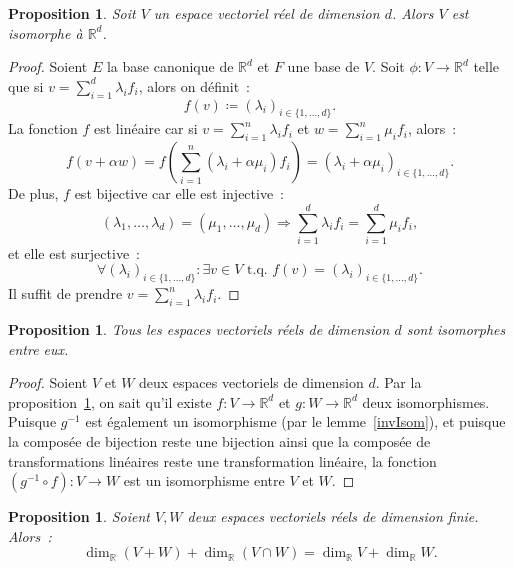 \documentclass{article}
\newcommand{\R}{\mathbb R}
\newcommand{\tq}{\textrm{ t.q. }}
\newtheorem{prp}[thm]{Proposition}
\theoremstyle{definition}
\theoremstyle{remark}
\begin{document}
		\begin{prp}\label{dimDIsomorpheRd} Soit $V$ un espace vectoriel réel de dimension $d$. Alors $V$ est isomorphe à $\R^d$. \end{prp}

		\begin{proof} Soient $E$ la base canonique de $\R^d$ et $F$ une base de $V$. Soit $\phi : V \to \R^d$ telle que si $v = \sum_{i=1}^d\lambda_if_i$, alors on
		définit~: \[f(v) \coloneqq (\lambda_i)_{i \in \{1, \dotsc, d\}}.\] La fonction $f$ est linéaire car si
		$v = \sum_{i=1}^n\lambda_if_i$ et $w = \sum_{i=1}^n\mu_if_i$, alors~:
		\[f(v + \alpha w) = f\left(\sum_{i=1}^n(\lambda_i + \alpha\mu_i)f_i\right) = (\lambda_i + \alpha\mu_i)_{i \in \{1, \dotsc, d\}}.\]
		De plus, $f$ est bijective car elle est injective~:
		\[(\lambda_1, \dotsc, \lambda_d) = (\mu_1, \dotsc, \mu_d) \Rightarrow \sum_{i=1}^d\lambda_if_i = \sum_{i=1}^d\mu_if_i,\]
		et elle est surjective~:
		\[\forall (\lambda_i)_{i \in \{1, \dotsc, d\}} : \exists v \in V \tq f(v) = (\lambda_i)_{i \in \{1, \dotsc, d\}}.\]
		Il suffit de prendre $v = \sum_{i=1}^n\lambda_if_i$. \end{proof}

		\begin{prp}\label{dimDIso} Tous les espaces vectoriels réels de dimension $d$ sont isomorphes entre eux. \end{prp}

		\begin{proof} Soient $V$ et $W$ deux espaces vectoriels de dimension $d$. Par la proposition~\ref{dimDIsomorpheRd}, on sait qu'il existe $f : V \to \R^d$
		et $g : W \to \R^d$ deux isomorphismes. Puisque $g^{-1}$ est également un isomorphisme (par le lemme~\ref{invIsom}), et puisque la composée de bijection reste
		une bijection ainsi que la composée de transformations linéaires reste une transformation linéaire, la fonction $(g^{-1} \circ f) : V \to W$ est un isomorphisme
		entre $V$ et $W$. \end{proof}

		\begin{prp} Soient $V, W$ deux espaces vectoriels réels de dimension finie. Alors~: \[\dim_\R(V+W) + \dim_\R(V \cap W) = \dim_\R V + \dim_\R W.\] \end{prp}
\end{document}
